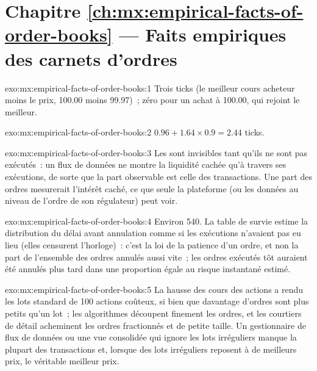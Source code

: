 \section*{Chapitre \ref{ch:mx:empirical-facts-of-order-books} --- Faits empiriques des carnets d'ordres}

\begin{solution}{exo:mx:empirical-facts-of-order-books:1}
Trois ticks (le meilleur cours acheteur moins le prix, 100.00 moins 99.97)~; zéro pour un achat à 100.00, qui rejoint le meilleur.
\end{solution}

\begin{solution}{exo:mx:empirical-facts-of-order-books:2}
$0.96+1.64\times0.9=2.44$ ticks.
\end{solution}

\begin{solution}{exo:mx:empirical-facts-of-order-books:3}
Les  sont invisibles tant qu'ils ne sont pas exécutés~: un flux de données ne montre la liquidité cachée qu'à travers ses exécutions, de sorte que la part observable est celle des transactions.
Une part des ordres mesurerait l'intérêt caché, ce que seule la plateforme (ou les données au niveau de l'ordre de son régulateur) peut voir.
\end{solution}

\begin{solution}{exo:mx:empirical-facts-of-order-books:4}
Environ 540. La table de survie estime la distribution du délai avant annulation comme si les exécutions n'avaient pas eu lieu (elles censurent l'horloge)~: c'est la
loi de la patience d'un ordre, et non la part de l'ensemble des ordres annulés aussi vite~; les ordres exécutés tôt auraient été annulés plus tard
dans une proportion égale au risque instantané estimé.
\end{solution}

\begin{solution}{exo:mx:empirical-facts-of-order-books:5}
La hausse des cours des actions a rendu les lots standard de 100 actions coûteux, si bien que davantage d'ordres sont plus petits qu'un lot~; les algorithmes découpent finement les ordres, et les courtiers de détail
acheminent les ordres fractionnés et de petite taille. Un gestionnaire de flux de données ou une vue consolidée qui ignore les lots irréguliers manque la plupart des transactions et, lorsque des lots irréguliers reposent à
de meilleurs prix, le véritable meilleur prix.
\end{solution}

